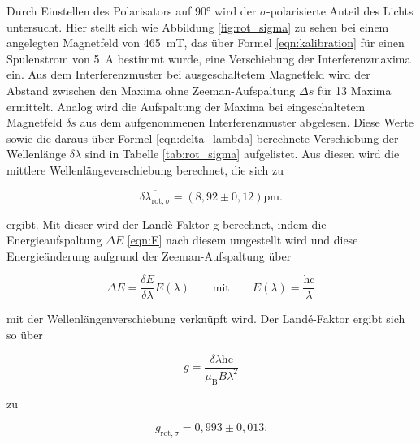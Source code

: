             Durch Einstellen des Polarisators auf 90° wird der $\sigma$-polarisierte Anteil des Lichts untersucht. Hier stellt sich wie Abbildung \ref{fig:rot_sigma} zu sehen bei einem angelegten Magnetfeld von 
            \SI{465}{\milli\tesla}, das über Formel \ref{eqn:kalibration} für einen Spulenstrom von \SI{5}{\ampere} bestimmt wurde, eine Verschiebung der Interferenzmaxima ein. Aus dem Interferenzmuster bei 
            ausgeschaltetem Magnetfeld wird der Abstand zwischen den Maxima ohne Zeeman-Aufspaltung $\Delta s$
            für 13 Maxima ermittelt. Analog wird die Aufspaltung der Maxima bei eingeschaltetem Magnetfeld $\delta s$ aus dem aufgenommenen Interferenzmuster abgelesen. Diese Werte sowie die daraus über Formel
            \ref{eqn:delta_lambda} berechnete Verschiebung der Wellenlänge $\delta\lambda$ sind in Tabelle \ref{tab:rot_sigma} aufgelistet. Aus diesen wird die mittlere Wellenlängeverschiebung berechnet, die sich 
            zu

            \begin{equation*}
                \overline{\delta \lambda_{\text{rot}, \sigma}} = \left(8,92 \pm 0,12\right)\si{\pico\metre}.
            \end{equation*}

            ergibt. Mit dieser wird der Landè-Faktor g berechnet, indem die Energieaufspaltung $\Delta E$ \ref{eqn:E} nach diesem umgestellt wird und diese Energieänderung aufgrund der 
            Zeeman-Aufspaltung über 

            \begin{equation*}
                \Delta E = \frac{\delta E}{\delta \lambda} E(\lambda) \qquad \text{mit} \qquad E(\lambda) = \frac{\text{hc}}{\lambda}
            \end{equation*}

            mit der Wellenlängenverschiebung verknüpft wird. Der Landé-Faktor ergibt sich so über
            
            \begin{equation}
              g = \frac{\delta\lambda\text{hc}}{\mu_{\text{B}}B\lambda^2}
              \label{eqn:Lande}
            \end{equation}
            
            zu

            \begin{equation*}
                g_{\text{rot}, \sigma} = 0,993 \pm 0,013 .
            \end{equation*}



